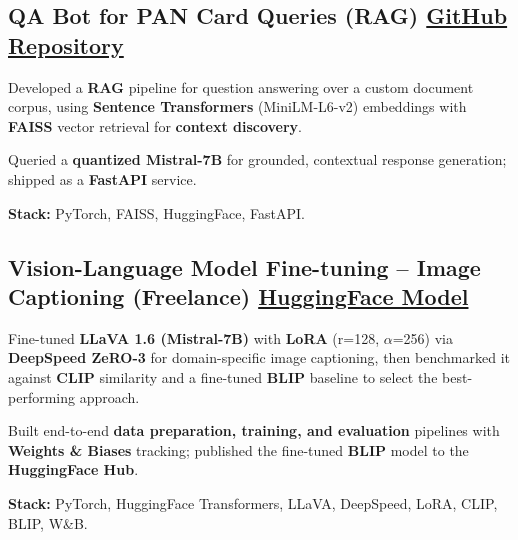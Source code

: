 \documentclass[letter,10pt]{article}
\begin{document}
\subsection{QA Bot for PAN Card Queries (RAG) \hfill \href{https://github.com/sunil448832/Natural-Language-Processing/tree/master/RAG(Retrieval\%20Augment\%20Generation)}{GitHub Repository}}
\begin{zitemize}
\item Developed a \textbf{RAG} pipeline for question answering over a custom document corpus, using \textbf{Sentence Transformers} (MiniLM-L6-v2) embeddings with \textbf{FAISS} vector retrieval for \textbf{context discovery}.
\item Queried a \textbf{quantized Mistral-7B} for grounded, contextual response generation; shipped as a \textbf{FastAPI} service.
\item \textbf{Stack:} PyTorch, FAISS, HuggingFace, FastAPI.
\end{zitemize}

\subsection{Vision-Language Model Fine-tuning – Image Captioning (Freelance) \hfill \href{https://huggingface.co/sunil448832/blip-model}{HuggingFace Model}}
\begin{zitemize}
\item Fine-tuned \textbf{LLaVA 1.6 (Mistral-7B)} with \textbf{LoRA} (r=128, $\alpha$=256) via \textbf{DeepSpeed ZeRO-3} for domain-specific image captioning, then benchmarked it against \textbf{CLIP} similarity and a fine-tuned \textbf{BLIP} baseline to select the best-performing approach.
\item Built end-to-end \textbf{data preparation, training, and evaluation} pipelines with \textbf{Weights \& Biases} tracking; published the fine-tuned \textbf{BLIP} model to the \textbf{HuggingFace Hub}.
\item \textbf{Stack:} PyTorch, HuggingFace Transformers, LLaVA, DeepSpeed, LoRA, CLIP, BLIP, W\&B.
\end{zitemize}
\end{document}
